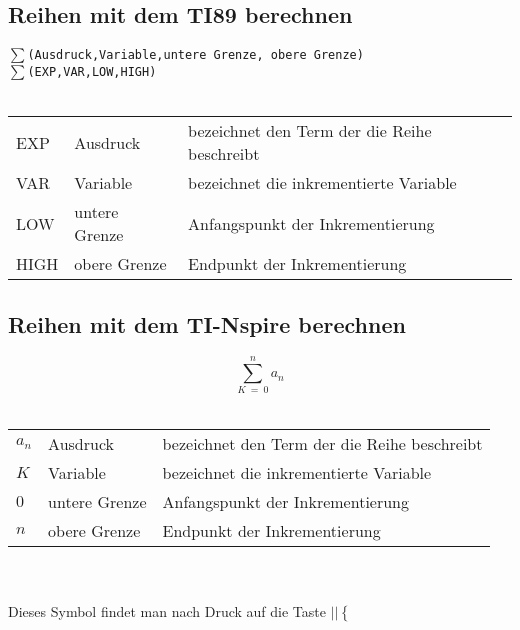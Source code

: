 \subsection{Reihen mit dem TI89 berechnen}
$\sum$\verb{(Ausdruck,Variable,untere Grenze, obere Grenze){ \\
$\sum$\verb{(EXP,VAR,LOW,HIGH){ \\\\
\begin{tabular}{lll}
EXP  & Ausdruck      & bezeichnet den Term der die Reihe beschreibt \\
VAR  & Variable      & bezeichnet die inkrementierte Variable \\
LOW  & untere Grenze & Anfangspunkt der Inkrementierung \\
HIGH & obere Grenze  & Endpunkt der Inkrementierung \\
\end{tabular}
\fi
\ifnspire
\subsection{Reihen mit dem TI-Nspire berechnen}
\[ \sum_{\boxed{K} ~=~ \boxed{0}}^{\boxed{n}}\boxed{a_n} \]\\
\begin{tabular}{lll}
$\boxed{a_n}$  & Ausdruck      & bezeichnet den Term der die Reihe beschreibt \\
$\boxed{K}$     & Variable      & bezeichnet die inkrementierte Variable \\
$\boxed{0}$    & untere Grenze & Anfangspunkt der Inkrementierung \\
$\boxed{n}$ & obere Grenze  & Endpunkt der Inkrementierung \\
\end{tabular}\\\\
Dieses Symbol findet man nach Druck auf die Taste $\boxed{\boxed{|\boxed{}|\left\{\frac{\boxed{}}{\boxed{}}\right.}}$
\fi
